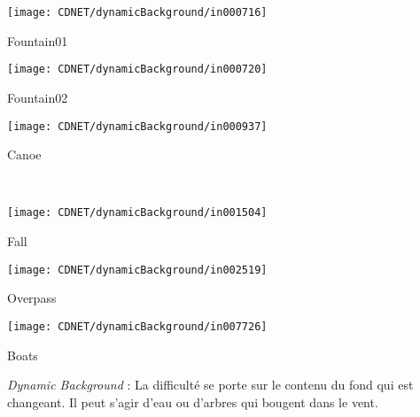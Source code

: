 	\begin{figureth}
		\begin{subfigureth}{0.24\textwidth}
			\texttt{[image: CDNET/dynamicBackground/in000716]}\caption{Fountain01}	
		\end{subfigureth}
		\begin{subfigureth}{0.24\textwidth}
			\texttt{[image: CDNET/dynamicBackground/in000720]}\caption{Fountain02}	
		\end{subfigureth}
		\begin{subfigureth}{0.24\textwidth}
			\texttt{[image: CDNET/dynamicBackground/in000937]}\caption{Canoe}	
		\end{subfigureth}\\
		\begin{subfigureth}{0.24\textwidth}
			\texttt{[image: CDNET/dynamicBackground/in001504]}\caption{Fall}	
		\end{subfigureth}
		\begin{subfigureth}{0.24\textwidth}
			\texttt{[image: CDNET/dynamicBackground/in002519]}\caption{Overpass}	
		\end{subfigureth}
		\begin{subfigureth}{0.24\textwidth}
			\texttt{[image: CDNET/dynamicBackground/in007726]}\caption{Boats}	
		\end{subfigureth}
		\caption[Catégorie Dynamic Background]{\textit{Dynamic Background} : La difficulté se porte sur le contenu du fond qui est changeant. Il peut s'agir d'eau ou d'arbres qui bougent dans le vent.}\label{fig:cdnet:dynamic}
	\end{figureth}

